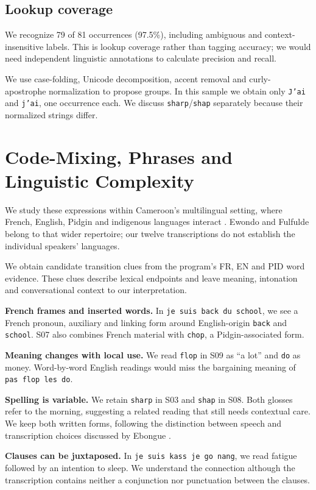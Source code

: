 \documentclass[11pt]{article}
\newcommand{\code}[1]{\texttt{#1}}
\begin{document}
\subsection*{Lookup coverage}
We recognize 79 of 81 occurrences (97.5\%), including ambiguous and
context-insensitive labels. This is lookup coverage rather than tagging
accuracy; we would need independent linguistic annotations to calculate
precision and recall.

We use case-folding, Unicode decomposition,
accent removal and curly-apostrophe normalization to propose groups. In this
sample we obtain only \code{J'ai} and \code{j'ai}, one occurrence each.
We discuss \code{sharp}/\code{shap} separately because their normalized
strings differ.

\clearpage
\section{Code-Mixing, Phrases and Linguistic Complexity}
We study these expressions within Cameroon's multilingual setting, where
French, English, Pidgin and indigenous languages interact \cite{ubanako}.
Ewondo and Fulfulde belong to that wider repertoire; our twelve transcriptions
do not establish the individual speakers' languages.

We obtain \CorpusSwitches{} candidate transition clues from the program's
FR, EN and PID word evidence. These clues describe lexical endpoints and
leave meaning, intonation and conversational context to our interpretation.

{\small}

\textbf{French frames and inserted words.}
In \code{je suis back du school}, we see a French pronoun, auxiliary and
linking form around English-origin \code{back} and \code{school}. S07 also
combines French material with \code{chop}, a Pidgin-associated form.

\textbf{Meaning changes with local use.}
We read \code{flop} in S09 as ``a lot'' and \code{do} as money. Word-by-word
English readings would miss the bargaining meaning of \code{pas flop les do}.

\textbf{Spelling is variable.}
We retain \code{sharp} in S03 and \code{shap} in S08. Both glosses refer to
the morning, suggesting a related reading that still needs contextual care.
We keep both written forms, following the distinction between speech and
transcription choices discussed by Ebongue \cite{ebongue}.

\textbf{Clauses can be juxtaposed.}
In \code{je suis kass je go nang}, we read fatigue followed by an intention
to sleep. We understand the connection although the transcription contains
neither a conjunction nor punctuation between the clauses.
\end{document}
